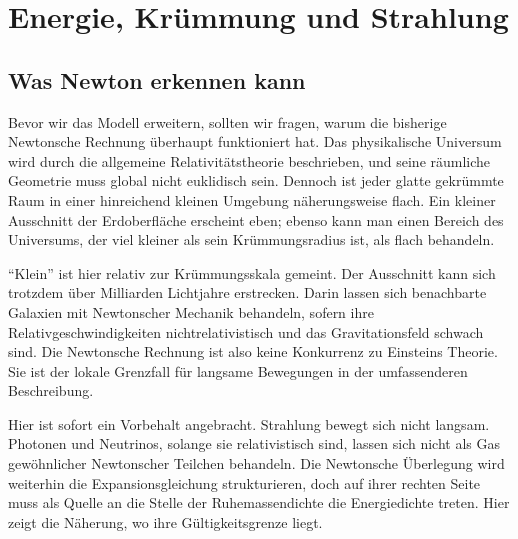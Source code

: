 \chapter{Energie, Krümmung und Strahlung}


\section{Was Newton erkennen kann}

Bevor wir das Modell erweitern, sollten wir fragen, warum die bisherige Newtonsche Rechnung überhaupt funktioniert hat. Das physikalische Universum wird durch die allgemeine Relativitätstheorie beschrieben, und seine räumliche Geometrie muss global nicht euklidisch sein. Dennoch ist jeder glatte gekrümmte Raum in einer hinreichend kleinen Umgebung näherungsweise flach. Ein kleiner Ausschnitt der Erdoberfläche erscheint eben; ebenso kann man einen Bereich des Universums, der viel kleiner als sein Krümmungsradius ist, als flach behandeln.

``Klein'' ist hier relativ zur Krümmungsskala gemeint. Der Ausschnitt kann sich trotzdem über Milliarden Lichtjahre erstrecken. Darin lassen sich benachbarte Galaxien mit Newtonscher Mechanik behandeln, sofern ihre Relativgeschwindigkeiten nichtrelativistisch und das Gravitationsfeld schwach sind. Die Newtonsche Rechnung ist also keine Konkurrenz zu Einsteins Theorie. Sie ist der lokale Grenzfall für langsame Bewegungen in der umfassenderen Beschreibung.

Hier ist sofort ein Vorbehalt angebracht. Strahlung bewegt sich nicht langsam. Photonen und Neutrinos, solange sie relativistisch sind, lassen sich nicht als Gas gewöhnlicher Newtonscher Teilchen behandeln. Die Newtonsche Überlegung wird weiterhin die Expansionsgleichung strukturieren, doch auf ihrer rechten Seite muss als Quelle an die Stelle der Ruhemassendichte die Energiedichte treten. Hier zeigt die Näherung, wo ihre Gültigkeitsgrenze liegt.

